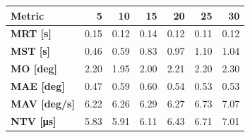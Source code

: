 \begin{tabular*}{\linewidth}{@{\extracolsep{\fill}}l|rrrrrr}
    \toprule
    \textbf{Metric} & \textbf{5} & \textbf{10} & \textbf{15} & \textbf{20} & \textbf{25} & \textbf{30} \\
    \midrule
    \textbf{MRT [s]} & 0.15 & 0.12 & 0.14 & 0.12 & 0.11 & 0.12 \\
    \textbf{MST [s]} & 0.46 & 0.59 & 0.83 & 0.97 & 1.10 & 1.04 \\
    \textbf{MO  [deg]} & 2.20 & 1.95 & 2.00 & 2.21 & 2.20 & 2.30 \\
    \textbf{MAE [deg]} & 0.47 & 0.59 & 0.60 & 0.54 & 0.53 & 0.53 \\
    \textbf{MAV [deg/s]} & 6.22 & 6.26 & 6.29 & 6.27 & 6.73 & 7.07 \\
    \textbf{NTV [\si{\micro\second}]} & 5.83 & 5.91 & 6.11 & 6.43 & 6.71 & 7.01 \\
    \bottomrule
\end{tabular*}

